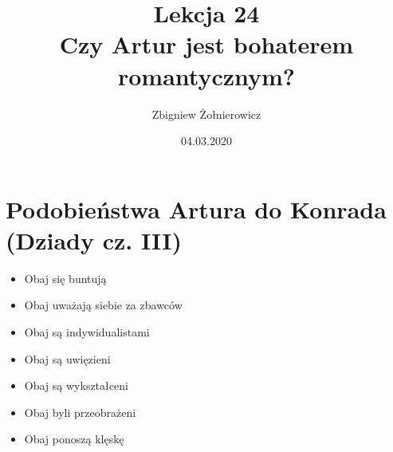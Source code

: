 \documentclass[a4paper]{article}
\begin{document}
\title{{\huge Lekcja 24} \\
{\large Czy Artur jest bohaterem romantycznym?}}
\author{Zbigniew Żołnierowicz}
\date{04.03.2020}
\maketitle
\section{Podobieństwa Artura do Konrada (Dziady cz. III)}
\begin{itemize}
    \item Obaj się buntują
    \item Obaj uważają siebie za zbawców
    \item Obaj są indywidualistami
    \item Obaj są uwięzieni
    \item Obaj są wykształceni
    \item Obaj byli przeobrażeni
    \item Obaj ponoszą klęskę
\end{itemize}
\end{document}
